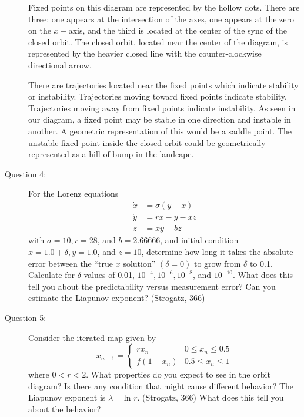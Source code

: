 \documentclass[letterpaper,10pt]{article}
\begin{document}
\begin{description}
Fixed points on this diagram are represented by the hollow dots. There are three; one appears at the intersection of the axes, one appears at the zero on the $x-$axis, and the third is located at the center of the sync of the closed orbit.  The closed orbit, located near the center of the diagram, is represented by the heavier closed line with the counter-clockwise directional arrow.

There are trajectories located near the fixed points which indicate stability or instability.  Trajectories moving toward fixed points indicate stability.  Trajectories moving away from fixed points indicate instability.  As seen in our diagram, a fixed point may be stable in one direction and instable in another.  A geometric representation of this would be a saddle point.  The unstable fixed point inside the closed orbit could be geometrically represented as a hill of bump in the
landcape.

\item[Question 4:]
For the Lorenz equations
\begin{align*}
\dot{x} &= \sigma(y-x) \\
\dot{y} &= rx-y-xz \\
\dot{z} &= xy-bz
\end{align*}
with $\sigma=10, r=28$, and $b=2.66666$, and initial condition $x=1.0+\delta, y=1.0$, and $z=10$, determine how long it takes the absolute error between the ``true $x$ solution'' $(\delta=0)$ to grow from $\delta$ to 0.1. Calculate for $\delta$ values of 0.01, $10^{-4}, 10^{-6}, 10^{-8}$, and $10^{-10}$.  What does this tell you about the predictability versus measurement error?  Can you estimate the Liapunov exponent? (Strogatz, 366)


\item[Question 5:]
Consider the iterated map given by
\[x_{n+1} = \left\{
  \begin{array}{lr}
    rx_n &  0\le x_n \le 0.5 \\
    f(1-x_n) &  0.5\le x_n \le 1
  \end{array}
\right.
\]
where $0<r<2$.  What properties do you expect to see in the orbit diagram?  Is there any condition that might cause different behavior?  The Liapunov exponent is $\lambda=\mbox{ln\ }r$. (Strogatz, 366)  What does this tell you about the behavior?


\end{description}
\end{document}
